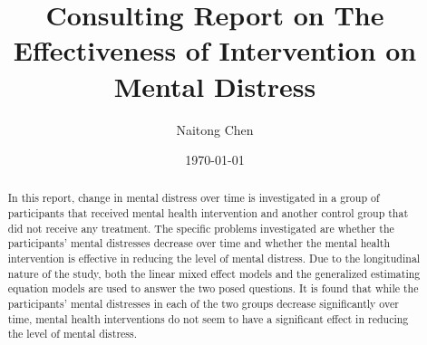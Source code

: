 \documentclass[10pt]{article}
\title{Consulting Report on The Effectiveness of Intervention on Mental Distress} %
\author{Naitong Chen} %
\date{\today} %
\begin{document}
\maketitle
\bigskip\bigskip\bigskip\bigskip\bigskip
\bigskip\bigskip\bigskip\bigskip\bigskip
\bigskip\bigskip\bigskip\bigskip\bigskip
\bigskip\bigskip\bigskip\bigskip\bigskip
\bigskip\bigskip\bigskip\bigskip\bigskip
\begin{abstract}
In this report, change in mental distress over time is investigated in a group of participants that received mental health intervention and another control group that did not receive any treatment. The specific problems investigated are whether the participants' mental distresses decrease over time and whether the mental health intervention is effective in reducing the level of mental distress. Due to the longitudinal nature of the study, both the linear mixed effect models and the generalized estimating equation models are used to answer the two posed questions. It is found that while the participants' mental distresses in each of the two groups decrease significantly over time, mental health interventions do not seem to have a significant effect in reducing the level of mental distress.
\end{abstract}
\thispagestyle{empty}
\clearpage
{}





\clearpage
\printbibliography

\clearpage
\appendix

\end{document}
